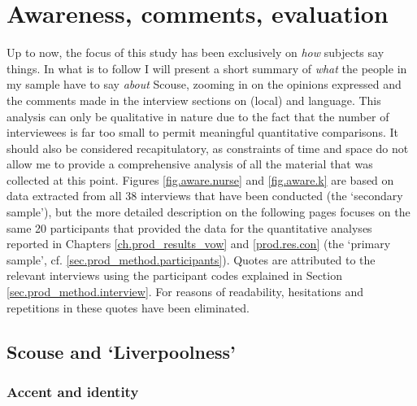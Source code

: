 \chapter{Awareness, comments, evaluation}
\label{prod.res.qual}

Up to now, the focus of this study has been exclusively on \emph{how} subjects say things.
In what is to follow I will present a short summary of \emph{what} the people in my sample have to say \emph{about} Scouse, zooming in on the opinions expressed and the comments made in the interview sections on (local)  and language.
This analysis can only be qualitative in nature due to the fact that the number of interviewees is far too small to permit meaningful quantitative comparisons.
It should also be considered recapitulatory, as constraints of time and space do not allow me to provide a comprehensive analysis of all the material that was collected at this point.
Figures \ref{fig.aware.nurse} and \ref{fig.aware.k} are based on data extracted from all 38 interviews that have been conducted (the `secondary sample'), but the more detailed description on the following pages focuses on the same 20 participants that provided the data for the quantitative analyses reported in Chapters \ref{ch.prod_results_vow} and \ref{prod.res.con} (the `primary sample', cf. \ref{sec.prod_method.participants}).
Quotes are attributed to the relevant interviews using the participant codes explained in Section \ref{sec.prod_method.interview}.
For reasons of readability, hesitations and repetitions in these quotes have been eliminated.

\section{Scouse and `Liverpoolness'}

\subsection{Accent and identity}

